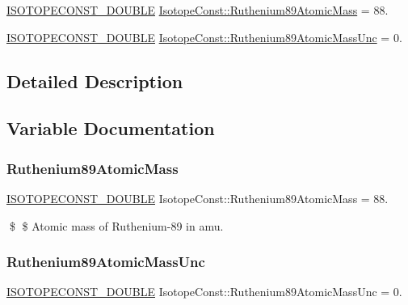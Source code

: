\begin{DoxyCompactItemize}
\item 
\mbox{\hyperlink{group___isotope_const-_macros_ga8f45a7272ce02c0b4c65c44636ed719a}{I\+S\+O\+T\+O\+P\+E\+C\+O\+N\+S\+T\+\_\+\+D\+O\+U\+B\+LE}} \mbox{\hyperlink{group___isotope_const-_ruthenium-_ru89_ga591e83d379849d790aec5c63981f425b}{Isotope\+Const\+::\+Ruthenium89\+Atomic\+Mass}} = 88.
\item 
\mbox{\hyperlink{group___isotope_const-_macros_ga8f45a7272ce02c0b4c65c44636ed719a}{I\+S\+O\+T\+O\+P\+E\+C\+O\+N\+S\+T\+\_\+\+D\+O\+U\+B\+LE}} \mbox{\hyperlink{group___isotope_const-_ruthenium-_ru89_ga24fbe278529571fe40b0458e6b4e14e4}{Isotope\+Const\+::\+Ruthenium89\+Atomic\+Mass\+Unc}} = 0.
\end{DoxyCompactItemize}


\subsection{Detailed Description}


\subsection{Variable Documentation}
\mbox{\label{group___isotope_const-_ruthenium-_ru89_ga591e83d379849d790aec5c63981f425b}} 
\subsubsection{\texorpdfstring{Ruthenium89\+Atomic\+Mass}{Ruthenium89AtomicMass}}
{\footnotesize\ttfamily \mbox{\hyperlink{group___isotope_const-_macros_ga8f45a7272ce02c0b4c65c44636ed719a}{I\+S\+O\+T\+O\+P\+E\+C\+O\+N\+S\+T\+\_\+\+D\+O\+U\+B\+LE}} Isotope\+Const\+::\+Ruthenium89\+Atomic\+Mass = 88.}

\$ \$ Atomic mass of Ruthenium-\/89 in amu. \mbox{\label{group___isotope_const-_ruthenium-_ru89_ga24fbe278529571fe40b0458e6b4e14e4}} 
\subsubsection{\texorpdfstring{Ruthenium89\+Atomic\+Mass\+Unc}{Ruthenium89AtomicMassUnc}}
{\footnotesize\ttfamily \mbox{\hyperlink{group___isotope_const-_macros_ga8f45a7272ce02c0b4c65c44636ed719a}{I\+S\+O\+T\+O\+P\+E\+C\+O\+N\+S\+T\+\_\+\+D\+O\+U\+B\+LE}} Isotope\+Const\+::\+Ruthenium89\+Atomic\+Mass\+Unc = 0.}

